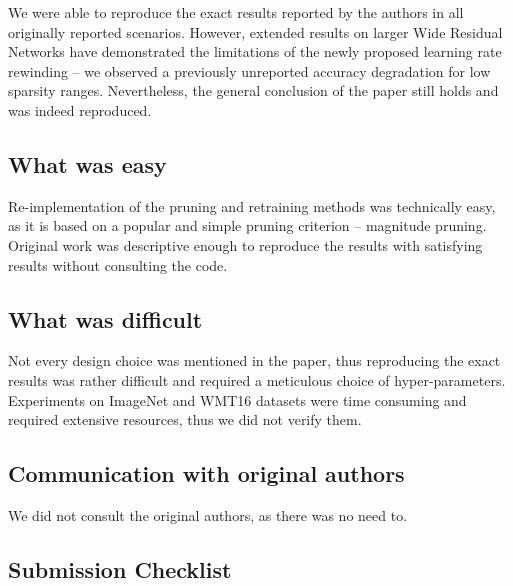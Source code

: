 We were able to reproduce the exact results reported by the authors in all originally reported scenarios. However, extended results on larger Wide Residual Networks have demonstrated the limitations of the newly proposed learning rate rewinding -- we observed a previously unreported accuracy degradation for low sparsity ranges. Nevertheless, the general conclusion of the paper still holds and was indeed reproduced.

\subsection*{What was easy}

Re-implementation of the pruning and retraining methods was technically easy, as it is based on a popular and simple pruning criterion -- magnitude pruning. Original work was descriptive enough to reproduce the results with satisfying results without consulting the code.

\subsection*{What was difficult}

Not every design choice was mentioned in the paper, thus reproducing the exact results was rather difficult and required a meticulous choice of hyper-parameters. Experiments on ImageNet and WMT16 datasets were time consuming and required extensive resources, thus we did not verify them.


\subsection*{Communication with original authors}

We did not consult the original authors, as there was no need to.

\subsection{Submission Checklist}

